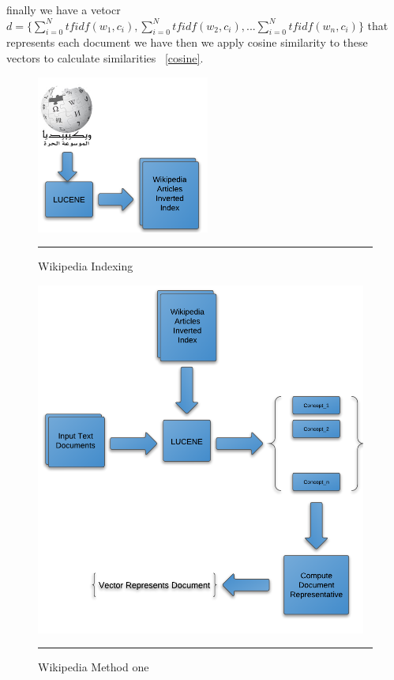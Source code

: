 finally we have a vetocr $d =\{\sum_{i=0}^{N} tfidf(w_1,c_i),\sum_{i=0}^{N} tfidf(w_2,c_i),...\sum_{i=0}^{N} tfidf(w_n,c_i)\} $ that represents each document we have then we apply cosine similarity to these vectors to calculate similarities ~\ref{cosine}.\\
\begin{figure}[htbp]
	\centering
		\includegraphics{./Figures/wiki_1.png}
		\rule{35em}{0.05pt}
	\caption[Wikipedia Indexing]{Wikipedia Indexing}
	\label{fig:Indexing}
\end{figure}

\begin{figure}[htbp]
	\centering
		\includegraphics{./Figures/wiki_3.png}
		\rule{35em}{0.05pt}
	\caption[Wikipedia Method one]{Wikipedia Method one}
	\label{fig:Method one}
\end{figure}

